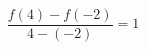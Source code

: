 \documentclass[preview]{standalone}
\begin{document}
\begin{align*}
\dfrac{f(4) - f(-2)}{4 - (-2)} = 1
\end{align*}
\end{document}
